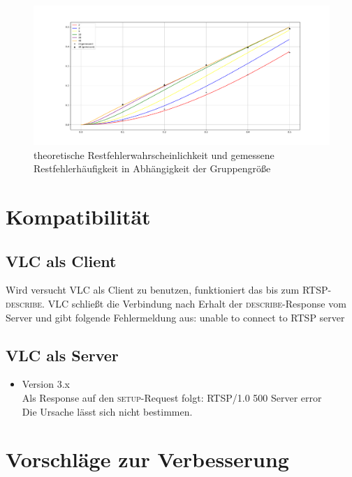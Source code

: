 \documentclass[12pt,a4paper]{article}
\begin{document}
\begin{landscape}

\newpage
\begin{figure}[h]
	\includegraphics[width=21cm]{Plot_Restfehler.pdf}
	\caption{theoretische Restfehlerwahrscheinlichkeit und gemessene Restfehlerhäufigkeit in Abhängigkeit der Gruppengröße}
\end{figure}

\end{landscape}

\section{Kompatibilität}

\subsection{VLC als Client}

Wird versucht VLC als Client zu benutzen, funktioniert das bis zum RTSP-\textsc{describe}. VLC schließt die Verbindung nach Erhalt der \textsc{describe}-Response vom Server und gibt folgende Fehlermeldung aus: \glqq unable to connect to RTSP server\grqq{}

\subsection{VLC als Server}

\begin{itemize}
\item Version 3.x\\
Als Response auf den \textsc{setup}-Request folgt: \glqq RTSP/1.0 500 Server error\grqq{}\\
Die Ursache lässt sich nicht bestimmen.
\end{itemize}

\section{Vorschläge zur Verbesserung}
\end{document}
